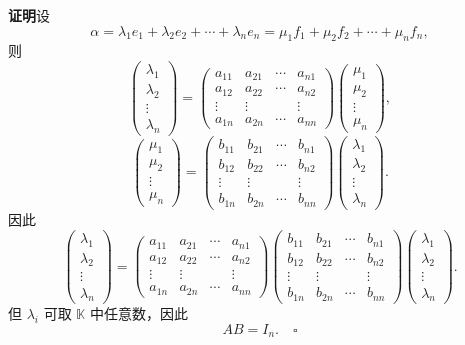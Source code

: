 \documentclass[UTF8, 12pt, fontset=fandol, oneside]{ctexart}
\begin{document}
\noindent\textbf{证明}\quad 设
\[
\alpha=\lambda_1e_1+\lambda_2e_2+\cdots+\lambda_ne_n=\mu_1f_1+\mu_2f_2+\cdots+\mu_nf_n,
\]
则
\[
\left(\begin{array}{c}
\lambda_1\\
\lambda_2\\
\vdots\\
\lambda_n
\end{array}\right)
=
\left(\begin{array}{cccc}
a_{11}&a_{21}&\cdots&a_{n1}\\
a_{12}&a_{22}&\cdots&a_{n2}\\
\vdots&\vdots&&\vdots\\
a_{1n}&a_{2n}&\cdots&a_{nn}
\end{array}\right)
\left(\begin{array}{c}
\mu_1\\
\mu_2\\
\vdots\\
\mu_n
\end{array}\right),
\]
\[
\left(\begin{array}{c}
\mu_1\\
\mu_2\\
\vdots\\
\mu_n
\end{array}\right)
=
\left(\begin{array}{cccc}
b_{11}&b_{21}&\cdots&b_{n1}\\
b_{12}&b_{22}&\cdots&b_{n2}\\
\vdots&\vdots&&\vdots\\
b_{1n}&b_{2n}&\cdots&b_{nn}
\end{array}\right)
\left(\begin{array}{c}
\lambda_1\\
\lambda_2\\
\vdots\\
\lambda_n
\end{array}\right).
\]
因此
\[
\left(\begin{array}{c}
\lambda_1\\
\lambda_2\\
\vdots\\
\lambda_n
\end{array}\right)
=
\left(\begin{array}{cccc}
a_{11}&a_{21}&\cdots&a_{n1}\\
a_{12}&a_{22}&\cdots&a_{n2}\\
\vdots&\vdots&&\vdots\\
a_{1n}&a_{2n}&\cdots&a_{nn}
\end{array}\right)
\left(\begin{array}{cccc}
b_{11}&b_{21}&\cdots&b_{n1}\\
b_{12}&b_{22}&\cdots&b_{n2}\\
\vdots&\vdots&&\vdots\\
b_{1n}&b_{2n}&\cdots&b_{nn}
\end{array}\right)
\left(\begin{array}{c}
\lambda_1\\
\lambda_2\\
\vdots\\
\lambda_n
\end{array}\right).
\]
但 $\lambda_i$ 可取 $\mathbb{K}$ 中任意数，因此
\[
AB=I_n. \quad \square
\]
\end{document}
